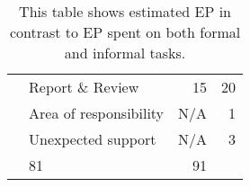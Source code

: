 \begin{table}[h]
{\begin{tabular}{llrr}
            &Report \& Review                                              & 15           & 20           \\      %
            &Area of responsibility                                        & N/A          & 1            \\
            &Unexpected support                                            & N/A          & 3            \\
            \tblgrpsep
            \midrule
            \multicolumn{2}{l}{Total}                                                         & 81           & 91           \\
    \end{tabular}}
    \caption{This table shows estimated EP in contrast to EP spent on both formal and informal tasks.}
    \label{tab:sprint1tasktable}
\end{table}
